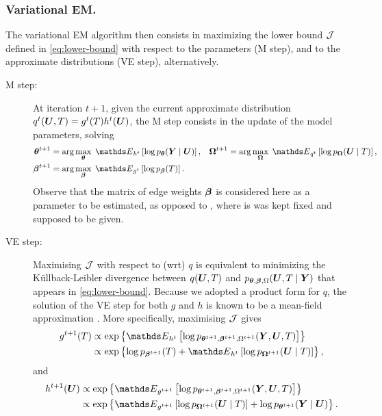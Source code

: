 \subsubsection*{Variational EM.}
The variational EM algorithm then consists in maximizing the lower bound ${\mathcal{J}}$ defined in \eqref{eq:lower-bound} with respect to the parameters (M step), and to the approximate distributions (VE step), alternatively. 
\begin{description}
\item[M step:] At iteration $t+1$, given the current approximate distribution $q^t({\boldsymbol{U}}, T) = g^t(T) h^t({\boldsymbol{U}})$, the M step consists in the update of the model parameters, solving 
\begin{align} \label{eq:Mstep}
\thetabf^{t+1} & = \arg\max_\thetabf \; \Esp_{h^t} \left[ \log p_\thetabf(\Ybf \mid \Ubf) \right], 
& \Omegabf^{t+1} & = \arg\max_\Omegabf \; \Esp_{q^t} \left[ \log p_{\Omegabf}(\Ubf \mid T) \right], \nonumber \\
\betabf^{t+1} & = \arg\max_\betabf \; \Esp_{g^t} \left[ \log p_\betabf(T) \right].
\end{align}
Observe that the matrix of edge weights ${\boldsymbol{\beta}}$ is considered here as a parameter to be estimated, as opposed to \cite{RAR19}, where is was kept fixed and supposed to be given.
%
\item[VE step:] Maximising ${\mathcal{J}}$ with respect to (wrt) $q$ is equivalent to minimizing the K\"ullback-Leibler divergence between $q({\boldsymbol{U}}, T)$ and $p_{{\boldsymbol{\theta}}, {\boldsymbol{\beta}}, \Omega}({\boldsymbol{U}}, T \mid {\boldsymbol{Y}})$ that appears in \eqref{eq:lower-bound}. Because we adopted a product form for $q$, the solution of the VE step for both $g$ and $h$ is known to be a mean-field approximation \citep{WaJ08}. More specifically, maximising ${\mathcal{J}}$ gives
\begin{align} \label{eq:VEstep-g}
g^{t+1}(T) 
& \propto \exp \left\{ \Esp_{h^t} \left[ \log p_{\thetabf^{t+1}, \betabf^{t+1}, \Omega^{t+1}}(\Ybf, \Ubf, T) \right] \right\} \nonumber \\
& \propto \exp \left\{ \log p_{\betabf^{t+1}}(T) + \Esp_{h^t} \left[ \log p_{\Omegabf^{t+1}}(\Ubf \mid T) \right] \right\},
\end{align}
and
\begin{align} \label{eq:VEstep-hH}
h^{t+1}(\Ubf) 
& \propto \exp \left\{ \Esp_{g^{t+1}} \left[ \log p_{\thetabf^{t+1}, \betabf^{t+1}, \Omega^{t+1}}(\Ybf, \Ubf, T) \right] \right\} \nonumber \\
& \propto \exp \left\{ \Esp_{g^{t+1}} \left[ \log p_{\Omegabf^{t+1}}(\Ubf \mid T) \right] + \log p_{\thetabf^{t+1}}(\Ybf \mid \Ubf) \right\}. 
\end{align}
\end{description}

